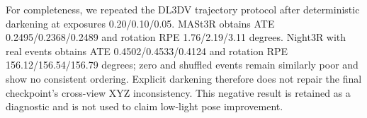 For completeness, we repeated the DL3DV trajectory protocol after deterministic
darkening at exposures 0.20/0.10/0.05.  MASt3R obtains ATE
0.2495/0.2368/0.2489 and rotation RPE 1.76/2.19/3.11 degrees.  Night3R with real
events obtains ATE 0.4502/0.4533/0.4124 and rotation RPE
156.12/156.54/156.79 degrees; zero and shuffled events remain similarly poor
and show no consistent ordering.  Explicit darkening therefore does not repair
the final checkpoint's cross-view XYZ inconsistency.  This negative result is
retained as a diagnostic and is not used to claim low-light pose improvement.
